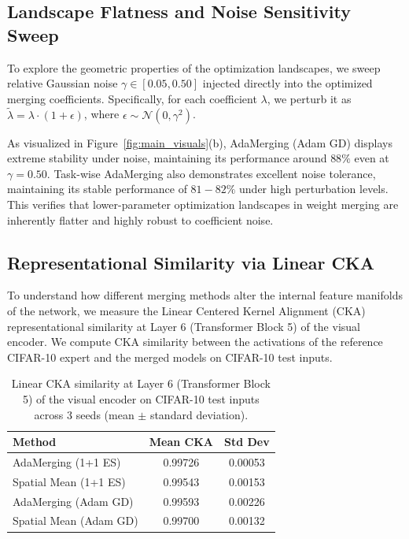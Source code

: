 \subsection{Landscape Flatness and Noise Sensitivity Sweep}
To explore the geometric properties of the optimization landscapes, we sweep relative Gaussian noise $\gamma \in [0.05, 0.50]$ injected directly into the optimized merging coefficients. Specifically, for each coefficient $\lambda$, we perturb it as $\tilde{\lambda} = \lambda \cdot (1 + \epsilon)$, where $\epsilon \sim \mathcal{N}(0, \gamma^2)$. 

As visualized in Figure~\ref{fig:main_visuals}(b), AdaMerging (Adam GD) displays extreme stability under noise, maintaining its performance around $88\%$ even at $\gamma=0.50$. Task-wise AdaMerging also demonstrates excellent noise tolerance, maintaining its stable performance of $81-82\%$ under high perturbation levels. This verifies that lower-parameter optimization landscapes in weight merging are inherently flatter and highly robust to coefficient noise.

\subsection{Representational Similarity via Linear CKA}
To understand how different merging methods alter the internal feature manifolds of the network, we measure the Linear Centered Kernel Alignment (CKA) \cite{cka} representational similarity at Layer 6 (Transformer Block 5) of the visual encoder. We compute CKA similarity between the activations of the reference CIFAR-10 expert and the merged models on CIFAR-10 test inputs.

\begin{table}[h]
\caption{Linear CKA similarity at Layer 6 (Transformer Block 5) of the visual encoder on CIFAR-10 test inputs across 3 seeds (mean $\pm$ standard deviation).}
\label{tab:cka}
\vskip 0.1in
\begin{center}
\begin{small}
\begin{sc}
\begin{tabular}{lcc}
\toprule
Method & Mean CKA & Std Dev \\
\midrule
AdaMerging (1+1 ES) & 0.99726 & 0.00053 \\
Spatial Mean (1+1 ES) & 0.99543 & 0.00153 \\
AdaMerging (Adam GD) & 0.99593 & 0.00226 \\
Spatial Mean (Adam GD) & 0.99700 & 0.00132 \\
\bottomrule
\end{tabular}
\end{sc}
\end{small}
\end{center}
\end{table}

